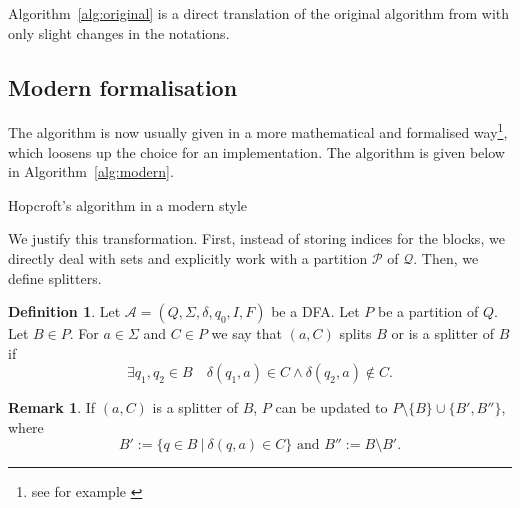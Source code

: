 \documentclass[12pt, a4 paper]{article}
\theoremstyle{definition}
\newtheorem{remark}{Remark}
\newtheorem{definition}{Definition}
\begin{document}
\bigskip

Algorithm~\ref{alg:original} is a direct translation of the original algorithm from \cite{Hop71} with only slight changes in the notations.

\subsection{Modern formalisation}

The algorithm is now usually given in a more mathematical and formalised way\footnote{see for example \cite{esparza2023automata}}, which loosens up the choice for an implementation. The algorithm is given below in Algorithm~\ref{alg:modern}.

\bigskip

\begin{algorithm}[H]
    \SetAlgoLined
    \caption{Hopcroft's algorithm in a modern style}
    \label{alg:modern}
\end{algorithm}

\bigskip

We justify this transformation. First, instead of storing indices for the blocks, we directly deal with sets and explicitly work with a partition $\mathcal{P}$ of $\mathcal{Q}$. Then, we define splitters.

\begin{definition}
    Let $\mathcal{A} = (Q, \Sigma, \delta, q_0, I, F)$ be a DFA. Let $P$ be a partition of $Q$. Let $B \in P$. For $a \in \Sigma$ and $C \in P$ we say that
    $(a, C)$ splits $B$ or is a splitter of $B$ if $$\exists q_1, q_2 \in B \quad \delta(q_1, a) \in C \land \delta(q_2, a) \notin C.$$
\end{definition}
\begin{remark}
    If $(a, C)$ is a splitter of $B$, $P$ can be updated to $P \setminus \{B\} \cup \{B', B''\}$, where $$B' := \{q \in B \ | \ \delta(q, a) \in C\} \text{ and } B'' := B \setminus B'.$$
\end{remark}
\end{document}
